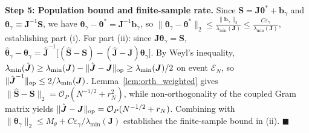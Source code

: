 \textbf{Step 5: Population bound and finite-sample rate.}
Since $\boldsymbol{S} = \boldsymbol{J}\boldsymbol{\theta}^* + \boldsymbol{b}_\gamma$ and $\boldsymbol{\theta}_\gamma \equiv \boldsymbol{J}^{-1}\boldsymbol{S}$, we have $\boldsymbol{\theta}_\gamma - \boldsymbol{\theta}^* = \boldsymbol{J}^{-1}\boldsymbol{b}_\gamma$, so $\|\boldsymbol{\theta}_\gamma - \boldsymbol{\theta}^*\|_2 \le \frac{\|\boldsymbol{b}_\gamma\|_2}{\lambda_{\min}(\boldsymbol{J})} \le \frac{C \varepsilon_\gamma}{\lambda_{\min}(\boldsymbol{J})}$, establishing part (i).
For part (ii): since $\boldsymbol{J}\boldsymbol{\theta}_\gamma = \boldsymbol{S}$, $\hat{\boldsymbol{\theta}}_\gamma - \boldsymbol{\theta}_\gamma = \hat{\boldsymbol{J}}^{-1}\big[(\hat{\boldsymbol{S}} - \boldsymbol{S}) - (\hat{\boldsymbol{J}} - \boldsymbol{J})\boldsymbol{\theta}_\gamma\big]$.
By Weyl's inequality, $\lambda_{\min}(\hat{\boldsymbol{J}}) \ge \lambda_{\min}(\boldsymbol{J}) - \|\hat{\boldsymbol{J}} - \boldsymbol{J}\|_{\rm op} \ge \lambda_{\min}(\boldsymbol{J})/2$ on event $\mathcal{E}_N$, so $\|\hat{\boldsymbol{J}}^{-1}\|_{\rm op} \le 2/\lambda_{\min}(\boldsymbol{J})$.
Lemma~\ref{lem:orth_weighted} gives $\|\hat{\boldsymbol{S}} - \boldsymbol{S}\|_2 = \mathcal{O}_P(N^{-1/2} + r_N^2)$, while non-orthogonality of the coupled Gram matrix yields $\|\hat{\boldsymbol{J}} - \boldsymbol{J}\|_{\rm op} = \mathcal{O}_P(N^{-1/2} + r_N)$. Combining with $\|\boldsymbol{\theta}_\gamma\|_2 \le M_\theta + C\varepsilon_\gamma/\lambda_{\min}(\boldsymbol{J})$ establishes the finite-sample bound in (ii). $\blacksquare$

